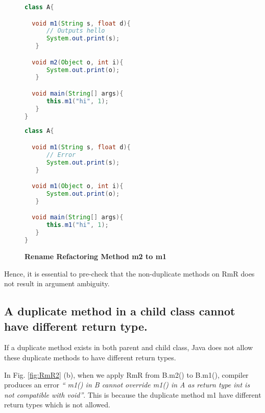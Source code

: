 \begin{figure}[th]
\centering
\begin{minipage}[t]{0.48\linewidth}
\begin{lstlisting}[language=java, basicstyle=\scriptsize\ttfamily,frame=single]
class A{

  void m1(String s, float d){
      // Outputs hello
      System.out.print(s); 
   }

  void m2(Object o, int i){
      System.out.print(o);
   }

  void main(String[] args){
      this.m1("hi", 1);
   }
}
\end{lstlisting}
\end{minipage}
\hfill
\begin{minipage}[t]{0.48\linewidth}
\begin{lstlisting}[language=java, basicstyle=\scriptsize\ttfamily,frame=single]
class A{

  void m1(String s, float d){
      // Error
      System.out.print(s); 
   }

  void m1(Object o, int i){
      System.out.print(o);
   }

  void main(String[] args){
      this.m1("hi", 1);
   }
}

\end{lstlisting}
\end{minipage}
\caption{\textbf{Rename Refactoring Method m2 to m1}}
\label{fig:RmR5}
\end{figure}

Hence, it is essential to pre-check that the non-duplicate methods on RmR does not result in argument ambiguity.

\subsection{A duplicate method in a child class cannot have different return type.}

If a duplicate method exists in both parent and child class, Java does not allow these duplicate methods to have different return types.

In Fig. \ref{fig:RmR2} (b), when we apply RmR from B.m2() to B.m1(), compiler produces an error \textsl{`` m1() in B cannot override m1() in A as return type int is not compatible with void''}. This is because the duplicate method m1 have different return types which is not allowed. 


